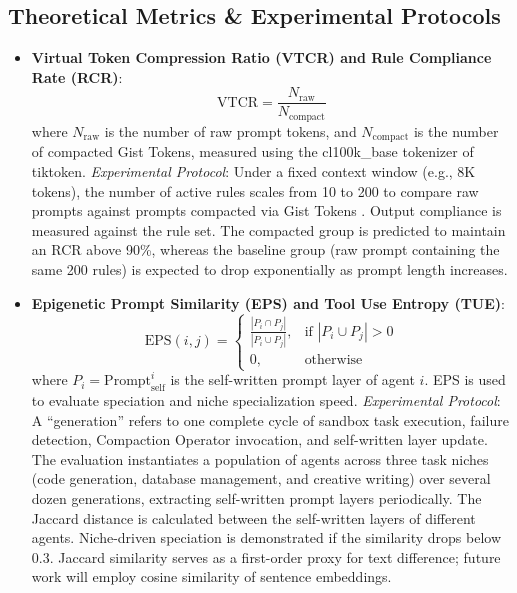 \documentclass[10pt,journal,compsoc]{IEEEtran}
\begin{document}
\subsection{Theoretical Metrics \& Experimental Protocols}
\begin{itemize}
    \item \textbf{Virtual Token Compression Ratio (VTCR) and Rule Compliance Rate (RCR)}:
    \begin{equation}
    \text{VTCR} = \frac{N_{\text{raw}}}{N_{\text{compact}}}
    \end{equation}
    where $N_{\text{raw}}$ is the number of raw prompt tokens, and $N_{\text{compact}}$ is the number of compacted Gist Tokens, measured using the cl100k\_base tokenizer of tiktoken.
    \textit{Experimental Protocol}: Under a fixed context window (e.g., 8K tokens), the number of active rules scales from 10 to 200 to compare raw prompts against prompts compacted via Gist Tokens \cite{mu2023}. Output compliance is measured against the rule set. The compacted group is predicted to maintain an RCR above 90\%, whereas the baseline group (raw prompt containing the same 200 rules) is expected to drop exponentially as prompt length increases.
    
    \item \textbf{Epigenetic Prompt Similarity (EPS) and Tool Use Entropy (TUE)}:
    \begin{equation}
    \text{EPS}(i, j) = \begin{cases} 
    \frac{|P_i \cap P_j|}{|P_i \cup P_j|}, & \text{if } |P_i \cup P_j| > 0 \\ 
    0, & \text{otherwise} 
    \end{cases}
    \end{equation}
    where $P_i = \text{Prompt}_{\text{self}}^i$ is the self-written prompt layer of agent $i$. EPS is used to evaluate speciation and niche specialization speed.
    \textit{Experimental Protocol}: A ``generation'' refers to one complete cycle of sandbox task execution, failure detection, Compaction Operator invocation, and self-written layer update. The evaluation instantiates a population of agents across three task niches (code generation, database management, and creative writing) over several dozen generations, extracting self-written prompt layers periodically. The Jaccard distance is calculated between the self-written layers of different agents. Niche-driven speciation is demonstrated if the similarity drops below 0.3. Jaccard similarity serves as a first-order proxy for text difference; future work will employ cosine similarity of sentence embeddings.
    

\end{itemize}
\end{document}
